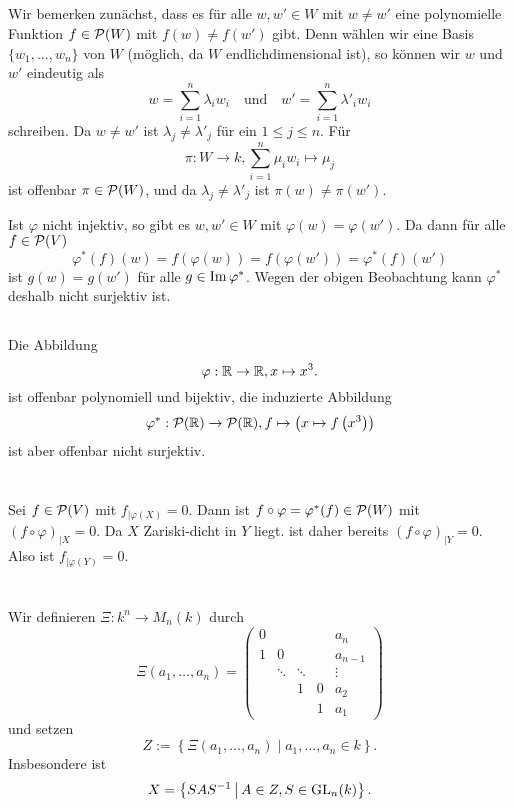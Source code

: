 \documentclass[a4paper,10pt]{article}
\begin{document}
\subsection{}
Wir bemerken zunächst, dass es für alle $w, w' \in W$ mit $w \neq w'$ eine polynomielle Funktion $f \in \mathcal{P}(W)$ mit $f(w) \neq f(w')$ gibt. Denn wählen wir eine Basis $\{w_1, \ldots, w_n\}$ von $W$ (möglich, da $W$ endlichdimensional ist), so können wir $w$ und $w'$ eindeutig als
\[
 w = \sum_{i=1}^n \lambda_i w_i \quad \text{und} \quad w' = \sum_{i=1}^n \lambda'_i w_i
\]
schreiben. Da $w \neq w'$ ist $\lambda_j \neq \lambda'_j$ für ein $1 \leq j \leq n$. Für
\[
 \pi : W \to k, \sum_{i=1}^n \mu_i w_i \mapsto \mu_j
\]
ist offenbar $\pi \in \mathcal{P}(W)$, und da $\lambda_j \neq \lambda'_j$ ist $\pi(w) \neq \pi(w')$.

Ist $\varphi$ nicht injektiv, so gibt es $w, w' \in W$ mit $\varphi(w) = \varphi(w')$. Da dann für alle $f \in \mathcal{P}(V)$
\[
 \varphi^*(f)(w) = f(\varphi(w)) = f(\varphi(w')) = \varphi^*(f)(w')
\]
ist $g(w) = g(w')$ für alle $g \in \operatorname{Im} \varphi^*$. Wegen der obigen Beobachtung kann $\varphi^*$ deshalb nicht surjektiv ist.


\subsection{}
Die Abbildung
\[
 \varphi : \mathbb{R} \to \mathbb{R}, x \mapsto x^3.
\]
ist offenbar polynomiell und bijektiv, die induzierte Abbildung
\[
 \varphi^* : \mathcal{P}(\mathbb{R}) \to \mathcal{P}(\mathbb{R}), f \mapsto \left( x \mapsto f\left(x^3\right) \right)
\]
ist aber offenbar nicht surjektiv.





\section{}
Sei $f \in \mathcal{P}(V)$ mit $f_{|\varphi(X)} = 0$. Dann ist $f \circ \varphi = \varphi^*(f) \in \mathcal{P}(W)$ mit $(f \circ \varphi)_{|X} = 0$. Da $X$ Zariski-dicht in $Y$ liegt. ist daher bereits $(f \circ \varphi)_{|Y} = 0$. Also ist $f_{|\varphi(Y)} = 0$.





\section{}
Wir definieren $\Xi : k^n \to M_n(k)$ durch
\[
 \Xi(a_1, \ldots, a_n) = 
 \begin{pmatrix}
  0 &        &        &   & a_n     \\
  1 &      0 &        &   & a_{n-1} \\
    & \ddots & \ddots &   & \vdots  \\
    &        &      1 & 0 & a_2     \\
    &        &        & 1 & a_1
 \end{pmatrix}
\]
und setzen
\[
 Z := \left\{ \Xi(a_1, \ldots, a_n) \mid a_1, \ldots, a_n \in k \right\}.
\]
Insbesondere ist
\begin{equation}\label{eq: X als Orbit von Z}  
 X = \left\{ SAS^{-1} \,\middle|\, A \in Z, S \in \operatorname{GL}_n(k) \right\}.
\end{equation}
\end{document}
